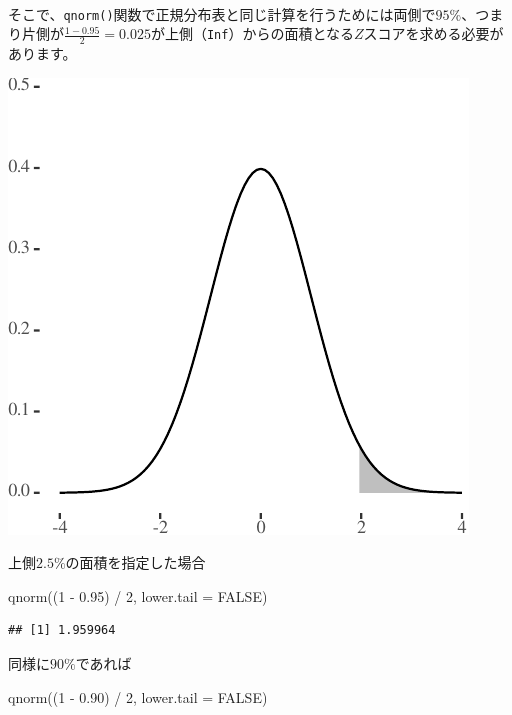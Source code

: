 \documentclass[]{tufte-handout}
\newenvironment{Shaded}{}{}
\newcommand{\AttributeTok}[1]{\textcolor[rgb]{0.49,0.56,0.16}{#1}}
\newcommand{\ConstantTok}[1]{\textcolor[rgb]{0.53,0.00,0.00}{#1}}
\newcommand{\DecValTok}[1]{\textcolor[rgb]{0.25,0.63,0.44}{#1}}
\newcommand{\FloatTok}[1]{\textcolor[rgb]{0.25,0.63,0.44}{#1}}
\newcommand{\FunctionTok}[1]{\textcolor[rgb]{0.02,0.16,0.49}{#1}}
\newcommand{\NormalTok}[1]{#1}
\newcommand{\SpecialCharTok}[1]{\textcolor[rgb]{0.25,0.44,0.63}{#1}}
\begin{document}
　

そこで、\texttt{qnorm()}関数で正規分布表と同じ計算を行うためには両側で\(95\%\)、つまり片側が\(\frac{1 - 0.95}{2} = 0.025\)が上側（\texttt{Inf}）からの面積となる\(Z\)スコアを求める必要があります。

\begin{marginfigure}

{\centering \includegraphics{NormTable_files/figure-latex/unnamed-chunk-4-1} 

}

\caption[上側$2.5\%$の面積を指定した場合]{上側$2.5\%$の面積を指定した場合}\label{fig:unnamed-chunk-4}
\end{marginfigure}

\begin{Shaded}
\begin{Highlighting}[numbers=left,,]
\FunctionTok{qnorm}\NormalTok{((}\DecValTok{1} \SpecialCharTok{{-}} \FloatTok{0.95}\NormalTok{) }\SpecialCharTok{/} \DecValTok{2}\NormalTok{, }\AttributeTok{lower.tail =} \ConstantTok{FALSE}\NormalTok{)}
\end{Highlighting}
\end{Shaded}

\begin{verbatim}
## [1] 1.959964
\end{verbatim}

同様に\(90\%\)であれば

\begin{Shaded}
\begin{Highlighting}[numbers=left,,]
\FunctionTok{qnorm}\NormalTok{((}\DecValTok{1} \SpecialCharTok{{-}} \FloatTok{0.90}\NormalTok{) }\SpecialCharTok{/} \DecValTok{2}\NormalTok{, }\AttributeTok{lower.tail =} \ConstantTok{FALSE}\NormalTok{)}
\end{Highlighting}
\end{Shaded}
\end{document}
